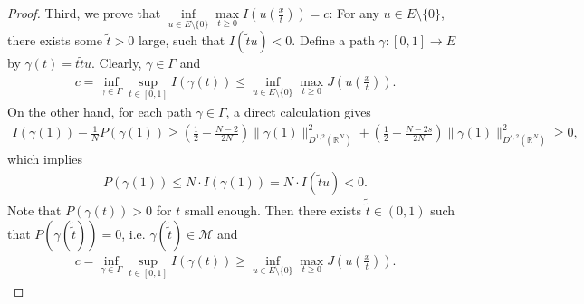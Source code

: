 \documentclass[12pt,a4paper,reqno]{amsart}
\numberwithin{equation}{section}
\begin{document}
\begin{proof}
Third, we prove that $\inf\limits_{u\in E\setminus\{0\}}\max
\limits_{t\geqslant0}
I\left(u\left(\frac{x}{t}\right)\right)=c$:
For any $u\in E\setminus\{0\}$,
there exists some $\tilde{t}>0$ large,
such that $I(\tilde{t}u)<0$.
Define a path $\gamma:[0, 1]\to E$ by $\gamma(t) = t\tilde{t}u$.
Clearly, $\gamma\in\Gamma$ and
\begin{equation*}
\begin{aligned}
c=
\inf\limits_{\gamma\in \Gamma}\sup\limits_{t\in[0, 1]}I(\gamma (t))
\leqslant
\inf\limits_{u\in E\setminus\{0\}}\max
\limits_{t\geqslant0}
J\left(u\left(\frac{x}{t}\right)\right).
\end{aligned}
\end{equation*}
On the other hand, for each path $\gamma\in\Gamma$,
a direct calculation gives
\begin{equation*}
\begin{aligned}
I(\gamma(1))
-\frac{1}{N}
P(\gamma(1))
\geqslant
\left(\frac{1}{2}-\frac{N-2}{2N}\right)\|\gamma(1)\|_{D^{1,2}(\mathbb{R}^{N})}^{2}
+
\left(\frac{1}{2}-\frac{N-2s}{2N}\right)\|\gamma(1)\|_{D^{s,2}(\mathbb{R}^{N})}^{2}
\geqslant 0,
\end{aligned}
\end{equation*}
which implies
\begin{equation*}
\begin{aligned}
P(\gamma(1))
\leqslant N\cdot I(\gamma(1))
=N\cdot I(\tilde{t}u)<0.
\end{aligned}
\end{equation*}
Note that $P(\gamma(t))>0$ for $t$ small enough.
Then there exists $\tilde{\tilde{t}} \in(0,1)$ such that $P(\gamma(\tilde{\tilde{t}})) = 0$, i.e. $\gamma(\tilde{\tilde{t}})\in \mathcal{M}$ and
\begin{equation*}
\begin{aligned}
c=
\inf\limits_{\gamma\in \Gamma}\sup\limits_{t\in[0, 1]}I(\gamma (t))
\geqslant
\inf\limits_{u\in E\setminus\{0\}}\max
\limits_{t\geqslant0}
J\left(u\left(\frac{x}{t}\right)\right).
\end{aligned}
\end{equation*}
\end{proof}
\end{document}

